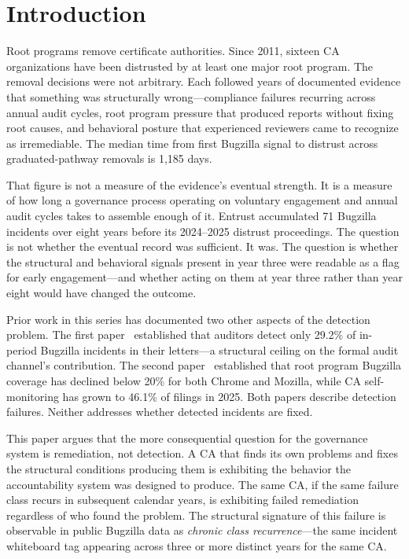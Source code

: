 \documentclass[10pt,twocolumn,letterpaper]{article}
\begin{document}
\section{Introduction}
\label{sec:intro}

Root programs remove certificate authorities. Since 2011, sixteen CA organizations have
been distrusted by at least one major root program. The removal decisions were not
arbitrary. Each followed years of documented evidence that something was structurally
wrong---compliance failures recurring across annual audit cycles, root program pressure
that produced reports without fixing root causes, and behavioral posture that experienced
reviewers came to recognize as irremediable. The median time from first Bugzilla signal to
distrust across graduated-pathway removals is 1,185 days.

That figure is not a measure of the evidence's eventual strength. It is a measure of how
long a governance process operating on voluntary engagement and annual audit cycles takes
to assemble enough of it. Entrust accumulated 71 Bugzilla incidents over eight years
before its 2024--2025 distrust proceedings. The question is not whether the eventual
record was sufficient. It was. The question is whether the structural and behavioral
signals present in year three were readable as a flag for early engagement---and whether
acting on them at year three rather than year eight would have changed the outcome.

Prior work in this series has documented two other aspects of the detection problem.
The first paper~\cite{p1} established that auditors detect only 29.2\% of in-period
Bugzilla incidents in their letters---a structural ceiling on the formal audit channel's
contribution. The second paper~\cite{p2} established that root program Bugzilla coverage
has declined below 20\% for both Chrome and Mozilla, while CA self-monitoring has grown
to 46.1\% of filings in 2025. Both papers describe detection failures. Neither addresses
whether detected incidents are fixed.

This paper argues that the more consequential question for the governance system is
remediation, not detection. A CA that finds its own problems and fixes the structural
conditions producing them is exhibiting the behavior the accountability system was designed
to produce. The same CA, if the same failure class recurs in subsequent calendar years,
is exhibiting failed remediation regardless of who found the problem. The structural
signature of this failure is observable in public Bugzilla data as \textit{chronic class
recurrence}---the same incident whiteboard tag appearing across three or more distinct
years for the same CA.
\end{document}
